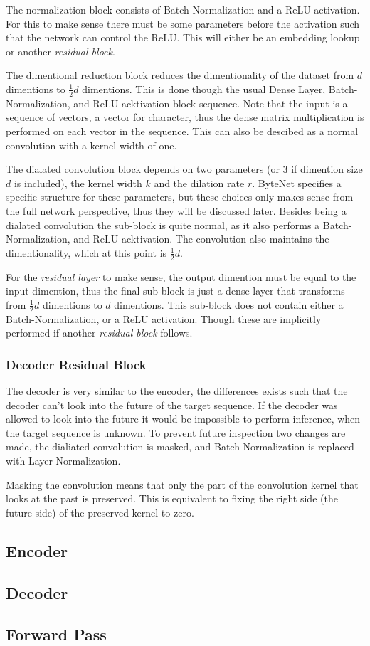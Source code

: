 The normalization block consists of Batch-Normalization and a ReLU activation. For this to make sense there must be some parameters before the activation such that the network can control the ReLU. This will either be an embedding lookup or another \textit{residual block}.

The dimentional reduction block reduces the dimentionality of the dataset from $d$ dimentions to $\frac{1}{2}d$ dimentions. This is done though the usual Dense Layer, Batch-Normalization, and ReLU acktivation block sequence. Note that the input is a sequence of vectors, a vector for character, thus the dense matrix multiplication is performed on each vector in the sequence. This can also be descibed as a normal convolution with a kernel width of one.

\afterpage{\clearpage}

The dialated convolution block depends on two parameters (or 3 if dimention size $d$ is included), the kernel width $k$ and the dilation rate $r$. ByteNet specifies a specific structure for these parameters, but these choices only makes sense from the full network perspective, thus they will be discussed later. Besides being a dialated convolution the sub-block is quite normal, as it also performs a Batch-Normalization, and ReLU acktivation. The convolution also maintains the dimentionality, which at this point is $\frac{1}{2}d$.

For the \textit{residual layer} to make sense, the output dimention must be equal to the input dimention, thus the final sub-block is just a dense layer that transforms from $\frac{1}{2}d$ dimentions to $d$ dimentions. This sub-block does not contain either a Batch-Normalization, or a ReLU activation. Though these are implicitly performed if another \textit{residual block} follows.

\subsubsection{Decoder Residual Block}

The decoder is very similar to the encoder, the differences exists such that the decoder can't look into the future of the target sequence. If the decoder was allowed to look into the future it would be impossible to perform inference, when the target sequence is unknown. To prevent future inspection two changes are made‚ the dialiated convolution is masked, and Batch-Normalization is replaced with Layer-Normalization.

Masking the convolution means that only the part of the convolution kernel that looks at the past is preserved. This is equivalent to fixing the right side (the future side) of the preserved kernel to zero.

\subsection{Encoder}
\subsection{Decoder}
\subsection{Forward Pass}

